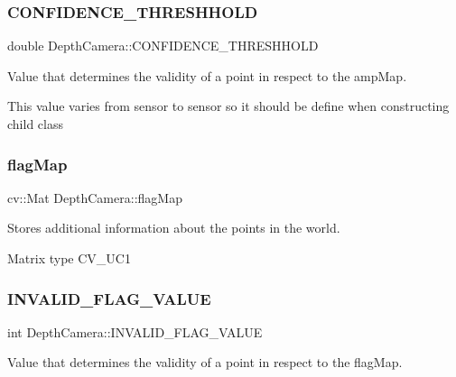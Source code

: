 \subsubsection{\texorpdfstring{C\+O\+N\+F\+I\+D\+E\+N\+C\+E\+\_\+\+T\+H\+R\+E\+S\+H\+H\+O\+LD}{CONFIDENCE\_THRESHHOLD}}
{\footnotesize\ttfamily double Depth\+Camera\+::\+C\+O\+N\+F\+I\+D\+E\+N\+C\+E\+\_\+\+T\+H\+R\+E\+S\+H\+H\+O\+LD\hspace{0.3cm}{\ttfamily [protected]}}



Value that determines the validity of a point in respect to the amp\+Map. 

This value varies from sensor to sensor so it should be define when constructing child class \hypertarget{class_depth_camera_a5b6e685ea92518f7deeb317ff6d0358f}{}\label{class_depth_camera_a5b6e685ea92518f7deeb317ff6d0358f} 
\subsubsection{\texorpdfstring{flag\+Map}{flagMap}}
{\footnotesize\ttfamily cv\+::\+Mat Depth\+Camera\+::flag\+Map\hspace{0.3cm}{\ttfamily [protected]}}



Stores additional information about the points in the world. 

Matrix type C\+V\+\_\+U\+C1 \hypertarget{class_depth_camera_af7eb5186ae7366de110bb5b08803e11d}{}\label{class_depth_camera_af7eb5186ae7366de110bb5b08803e11d} 
\subsubsection{\texorpdfstring{I\+N\+V\+A\+L\+I\+D\+\_\+\+F\+L\+A\+G\+\_\+\+V\+A\+L\+UE}{INVALID\_FLAG\_VALUE}}
{\footnotesize\ttfamily int Depth\+Camera\+::\+I\+N\+V\+A\+L\+I\+D\+\_\+\+F\+L\+A\+G\+\_\+\+V\+A\+L\+UE\hspace{0.3cm}{\ttfamily [protected]}}



Value that determines the validity of a point in respect to the flag\+Map. 

